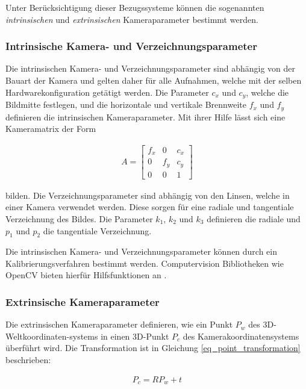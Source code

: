 Unter Berücksichtigung dieser Bezugssysteme können die sogenannten \textit{intrinsischen} und
\textit{extrinsischen} Kameraparameter bestimmt werden.

\subsubsection{Intrinsische Kamera- und Verzeichnungsparameter}

Die intrinsischen Kamera- und Verzeichnungsparameter sind abhängig von der Bauart der Kamera und gelten
daher für alle Aufnahmen, welche mit der selben Hardwarekonfiguration getätigt werden.
Die Parameter $c_x$ und $c_y$, welche die Bildmitte festlegen, und die
horizontale und vertikale Brennweite $f_x$ und $f_y$ definieren die intrinsischen Kameraparameter.
Mit ihrer Hilfe lässt sich eine Kameramatrix der Form

\begin{ceqn}
\begin{align}
A =
 \begin{bmatrix}
  f_x & 0 & c_x \\
  0 & f_y & c_y \\
  0 & 0 & 1
 \end{bmatrix}
\end{align}
\end{ceqn}

bilden.
Die Verzeichnungsparameter sind abhängig von den Linsen, welche in einer Kamera verwendet werden. Diese sorgen
für eine radiale und tangentiale Verzeichnung des Bildes. Die Parameter $k_1$, $k_2$ und $k_3$ definieren die
radiale und $p_1$ und $p_2$ die tangentiale Verzeichnung. \cite[]{Meissner2007}

Die intrinsischen Kamera- und Verzeichnungsparameter können durch ein Kalibrierungsverfahren bestimmt werden.
Computervision Bibliotheken wie OpenCV bieten hierfür Hilfsfunktionen an \cite[]{DevTeamOpenCV2018}.

\subsubsection{Extrinsische Kameraparameter}

Die extrinsischen Kameraparameter definieren, wie ein Punkt $P_w$ des 3D-Weltkoordinaten-systems in einen 3D-Punkt $P_c$
des Kamerakoordinatensystems überführt wird. Die Transformation ist in Gleichung \ref{eq_point_transformation}
beschrieben:

\begin{ceqn}
\begin{align}
\label{eq_point_transformation}
    P_c = R P_w + t
\end{align}
\end{ceqn}

